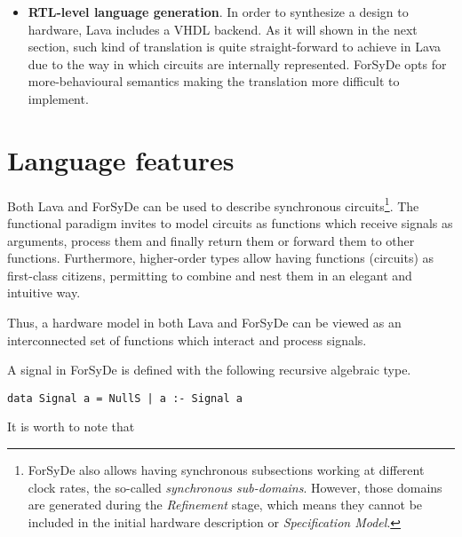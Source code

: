 \begin{itemize}
\item \textbf{RTL-level language generation}. In order to synthesize a
  design to hardware, Lava includes a VHDL backend. As it will shown in
  the next section, such kind of translation is quite straight-forward
  to achieve in Lava due to the way in which circuits are
  internally represented. ForSyDe opts for more-behavioural semantics
  making the translation more difficult to implement.
  
\end{itemize}



\section{Language features}

Both Lava and ForSyDe can be used to describe synchronous
circuits\footnote{ForSyDe also allows having synchronous subsections
  working at different clock rates, the so-called \textit{synchronous
    sub-domains}. However, those domains are generated during the
  \textit{Refinement} stage, which means they cannot be included in
  the initial hardware description or \textit{Specification Model}.}.
The functional paradigm invites to model circuits as functions which
receive signals as arguments, process them and finally return them or
forward them to other functions.  Furthermore, higher-order types
allow having functions (circuits) as first-class citizens, permitting
to combine and nest them in an elegant and intuitive way.

Thus, a hardware model in both Lava and ForSyDe can be viewed as an
interconnected set of functions which interact and process signals.

A signal in ForSyDe is defined with the following recursive algebraic type.


\begin{lstlisting}
data Signal a = NullS | a :- Signal a
\end{lstlisting}

It is worth to note that 

